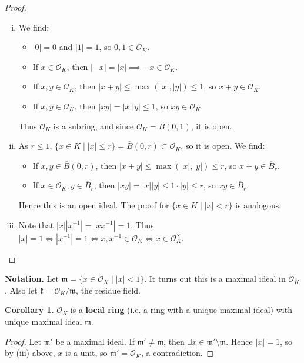 \documentclass{article}
\theoremstyle{definition}
\newtheorem{cor}[theorem]{Corollary}
\begin{document}
\begin{proof}
    \begin{enumerate}[(i)]
        \item We find:
        \begin{itemize}
            \item $|0|=0$ and $|1|=1$, so $0,1 \in \mathcal{O}_K$.
            \item If $x \in \mathcal{O}_K$, then $|-x|=|x| \implies -x \in \mathcal{O}_K$. 
            \item If $x,y \in \mathcal{O}_K$, then $|x+y|\le \max(|x|,|y|)\le 1$, so $x+y \in \mathcal{O}_K$. 
            \item If $x,y \in \mathcal{O}_K$, then $|xy| = |x||y| \le 1$, so $xy \in \mathcal{O}_K$.
        \end{itemize}
        Thus $\mathcal{O}_K$ is a subring, and since $\mathcal{O}_K = \overline{B}(0,1)$, it is open.
        \item As $r\le 1$, $\{x \in K \mid |x|\le r\} = \overline{B}(0,r) \subset \mathcal{O}_K$, so it is open. We find:
        \begin{itemize}
            \item If $x, y \in \overline{B}(0,r)$, then $|x+y|\le \max(|x|,|y|) \le r$, so $x+y \in \overline{B}_r$.
            \item If $x \in \mathcal{O}_K, y \in \overline{B}_r$, then $|xy|=|x||y|\le 1 \cdot |y|\le r$, so $xy \in \overline{B}_r$.
        \end{itemize}
        Hence this is an open ideal. The proof for $\{x \in K \mid |x|< r\}$ is analogous.
        \item Note that $|x||x^{-1}|= |x x^{-1}| = 1$. Thus $|x| = 1 \iff |x^{-1}| = 1 \iff x,x^{-1} \in \mathcal{O}_K \iff x \in \mathcal{O}_K^\times$.
    \end{enumerate}
\end{proof}

\textbf{Notation.} Let $\mathfrak{m} = \{x \in \mathcal{O}_K \mid |x|<1\}$. It turns out this is a maximal ideal in $\mathcal{O}_K$. Also let $\mathfrak{k} = \mathcal{O}_K/\mathfrak{m}$, the residue field. 

\begin{cor}
    $\mathcal{O}_K$ is a \textbf{local ring} (i.e. a ring with a unique maximal ideal) with unique maximal ideal $\mathfrak{m}$.
\end{cor}
\begin{proof}
    Let $\mathfrak{m'}$ be a maximal ideal. If $\mathfrak{m'} \neq \mathfrak{m}$, then $\exists x \in \mathfrak{m'}\setminus \mathfrak{m}$. Hence $|x|= 1$, so by (iii) above, $x$ is a unit, so $\mathfrak{m'}=\mathcal{O}_K$, a contradiction.
\end{proof}
\end{document}
